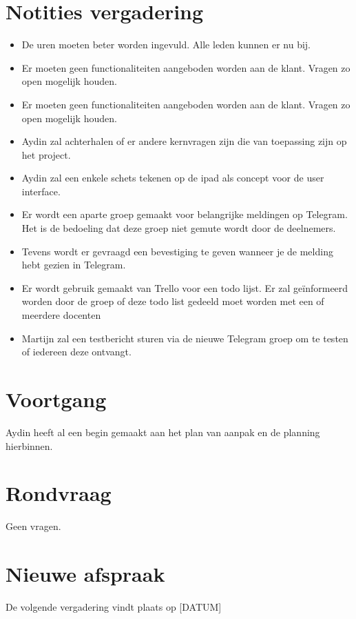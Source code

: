 \documentclass[dutch]{hu}
\begin{document}
\section{Notities vergadering}
\begin{itemize}

\item De uren moeten beter worden ingevuld. Alle leden kunnen er nu bij.

\item  Er moeten geen functionaliteiten aangeboden worden aan de klant. Vragen zo open mogelijk houden.

\item  Er moeten geen functionaliteiten aangeboden worden aan de klant. Vragen zo open mogelijk houden.

\item Aydin zal achterhalen of er andere kernvragen zijn die van toepassing zijn op het project.

\item Aydin zal een enkele schets tekenen op de ipad als concept voor de user interface.

\item Er wordt een aparte groep gemaakt voor belangrijke meldingen op Telegram. Het is de bedoeling dat deze groep niet gemute wordt door de deelnemers.

\item Tevens wordt er gevraagd een bevestiging te geven wanneer je de melding hebt gezien in Telegram.

\item Er wordt gebruik gemaakt van Trello voor een todo lijst. Er zal geïnformeerd worden door de groep of deze todo list gedeeld moet worden met een of meerdere docenten

\item Martijn zal een testbericht sturen via de nieuwe Telegram groep om te testen of iedereen deze ontvangt.

\end{itemize}

\section{Voortgang}
Aydin heeft al een begin gemaakt aan het plan van aanpak en de planning hierbinnen.

\section{Rondvraag}
Geen vragen.

\section{Nieuwe afspraak}
De volgende vergadering vindt plaats op [DATUM]
\end{document}
